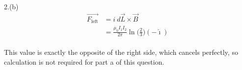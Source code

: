 \documentclass[11pt]{article}
\begin{document}
2.(b)
\begin{align*}
\overrightarrow{F_{\mathrm{left}}} &= i\ d\vec{L} \times \vec{B} \\
  &= \frac{\mu_0 I_1 I_2}{2 \pi } \ln \bigg(\frac{2}{3} \bigg) (-\hat{\imath}) \\
\end{align*}

This value is exactly the opposite of the right side, which cancels perfectly, so calculation is not required for part a of this question.
\end{document}
